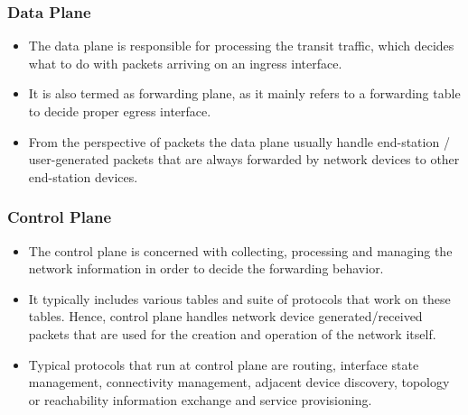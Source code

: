 \documentclass[12pt,letterpaper]{article}
\begin{document}
    \subsubsection{Data Plane}

        \begin{itemize}
            \item The data plane is responsible for processing the transit traffic, which decides what to do with packets arriving on an ingress interface.
            \item  It is also termed as forwarding plane, as it mainly refers to a forwarding table to decide proper egress interface.
            \item  From the perspective of packets the data plane usually handle end-station / user-generated packets that are always forwarded by network devices to other end-station devices.

        \end{itemize}

    \subsubsection{Control Plane}

        \begin{itemize}
            \item The control plane is concerned with collecting, processing and managing the network information in order to decide the forwarding behavior.
            
            \item It typically includes various tables and suite of protocols that work on these tables. Hence, control plane handles network device generated/received packets that are used for the creation and operation of the network itself.
                
            \item Typical protocols that run at control plane are routing, interface state management, connectivity management, adjacent device discovery, topology or reachability information exchange and service provisioning.

        \end{itemize}

    \newpage
\end{document}
